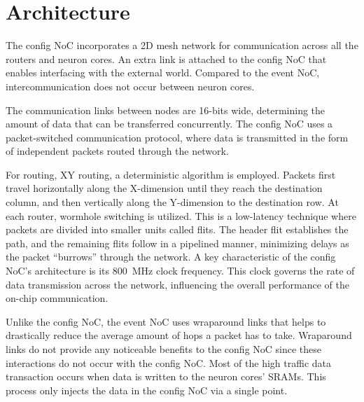 \section{Architecture}
The config NoC incorporates a 2D mesh network for communication across all the routers and neuron cores.
An extra link is attached to the config NoC that enables interfacing with the external world.
Compared to the event NoC, intercommunication does not occur between neuron cores.


The communication links between nodes are 16-bits wide, determining the amount of data that can be transferred concurrently.
The config NoC uses a packet-switched communication protocol, where data is transmitted in the form of independent packets routed through the network.

For routing, XY routing, a deterministic algorithm is employed.
Packets first travel horizontally along the X-dimension until they reach the destination column, and then vertically along the Y-dimension to the destination row.
At each router, wormhole switching is utilized.
This is a low-latency technique where packets are divided into smaller units called flits.
The header flit establishes the path, and the remaining flits follow in a pipelined manner, minimizing delays as the packet ``burrows'' through the network.
A key characteristic of the config NoC's architecture is its \SI{800}{MHz} clock frequency.
This clock governs the rate of data transmission across the network, influencing the overall performance of the on-chip communication.

Unlike the config NoC, the event NoC uses wraparound links that helps to drastically reduce the average amount of hops a packet has to take.
Wraparound links do not provide any noticeable benefits to the config NoC since these interactions do not occur with the config NoC.
Most of the high traffic data transaction occurs when data is written to the neuron cores' SRAMs.
This process only injects the data in the config NoC via a single point.
